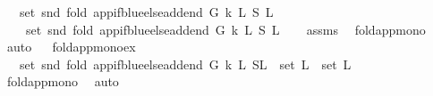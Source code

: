 \begin{isabellebody}
\ \ \ {\isachardoublequoteopen}set\ {\isacharparenleft}{\kern0pt}snd\ {\isacharparenleft}{\kern0pt}fold\ {\isacharparenleft}{\kern0pt}app{\isacharunderscore}{\kern0pt}if{\isacharunderscore}{\kern0pt}blue{\isacharunderscore}{\kern0pt}else{\isacharunderscore}{\kern0pt}add{\isacharunderscore}{\kern0pt}end\ G\ k{\isacharparenright}{\kern0pt}\ L\ {\isacharparenleft}{\kern0pt}S{}{\isacharcomma}{\kern0pt}\ L{}{\isacharparenright}{\kern0pt}{\isacharparenright}{\kern0pt}{\isacharparenright}{\kern0pt}\isanewline
\ \ \ {\isasymsubseteq}\ set\ {\isacharparenleft}{\kern0pt}snd\ {\isacharparenleft}{\kern0pt}fold\ {\isacharparenleft}{\kern0pt}app{\isacharunderscore}{\kern0pt}if{\isacharunderscore}{\kern0pt}blue{\isacharunderscore}{\kern0pt}else{\isacharunderscore}{\kern0pt}add{\isacharunderscore}{\kern0pt}end\ G\ k{\isacharparenright}{\kern0pt}\ L\ {\isacharparenleft}{\kern0pt}S{}{\isacharcomma}{\kern0pt}\ L{}{\isacharparenright}{\kern0pt}{\isacharparenright}{\kern0pt}{\isacharparenright}{\kern0pt}{\isachardoublequoteclose}\isanewline
%
\isadelimproof
\ \ %
\endisadelimproof
%
\isatagproof
{}\isamarkupfalse%
\ assms\ \isamarkupfalse%
\ fold{\isacharunderscore}{\kern0pt}app{\isacharunderscore}{\kern0pt}mono\isanewline
\ \ \isamarkupfalse%
\ auto%
\endisatagproof
{\isafoldproof}%
%
\isadelimproof
\ \isanewline
%
\endisadelimproof
\isanewline
\isanewline
{}\isamarkupfalse%
\ fold{\isacharunderscore}{\kern0pt}app{\isacharunderscore}{\kern0pt}mono{\isacharunderscore}{\kern0pt}ex{\isacharcolon}{\kern0pt}\ \isanewline
\ \ \ {\isachardoublequoteopen}set\ {\isacharparenleft}{\kern0pt}snd\ {\isacharparenleft}{\kern0pt}fold\ {\isacharparenleft}{\kern0pt}app{\isacharunderscore}{\kern0pt}if{\isacharunderscore}{\kern0pt}blue{\isacharunderscore}{\kern0pt}else{\isacharunderscore}{\kern0pt}add{\isacharunderscore}{\kern0pt}end\ G\ k{\isacharparenright}{\kern0pt}\ L{}\ {\isacharparenleft}{\kern0pt}S{\isacharcomma}{\kern0pt}L{}{\isacharparenright}{\kern0pt}{\isacharparenright}{\kern0pt}{\isacharparenright}{\kern0pt}\ {\isacharequal}{\kern0pt}\ {\isacharparenleft}{\kern0pt}set\ L{}\ {\isasymunion}\ set\ L{}{\isacharparenright}{\kern0pt}{\isachardoublequoteclose}\ \isanewline
%
\isadelimproof
\ \ %
\endisadelimproof
%
\isatagproof
{}\isamarkupfalse%
\ fold{\isacharunderscore}{\kern0pt}app{\isacharunderscore}{\kern0pt}mono\ \isamarkupfalse%
\ auto%
\endisatagproof

\end{isabellebody}
